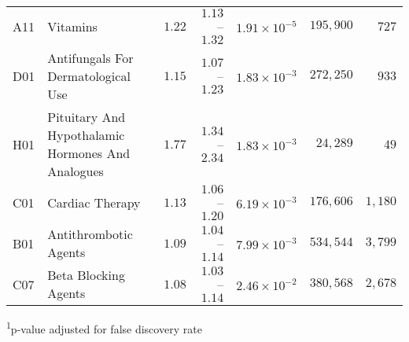 \begin{longtable}{llrrrrr}
A11 & Vitamins & $1.22$ & $1.13$–$1.32$ & $1.91 \times 10^{-5}$ & $195,900$ & $727$ \\ 
D01 & Antifungals For Dermatological Use & $1.15$ & $1.07$–$1.23$ & $1.83 \times 10^{-3}$ & $272,250$ & $933$ \\ 
H01 & Pituitary And Hypothalamic Hormones And Analogues & $1.77$ & $1.34$–$2.34$ & $1.83 \times 10^{-3}$ & $24,289$ & $49$ \\ 
C01 & Cardiac Therapy & $1.13$ & $1.06$–$1.20$ & $6.19 \times 10^{-3}$ & $176,606$ & $1,180$ \\ 
B01 & Antithrombotic Agents & $1.09$ & $1.04$–$1.14$ & $7.99 \times 10^{-3}$ & $534,544$ & $3,799$ \\ 
C07 & Beta Blocking Agents & $1.08$ & $1.03$–$1.14$ & $2.46 \times 10^{-2}$ & $380,568$ & $2,678$ \\ 
\bottomrule
\end{longtable}
\begin{minipage}{\linewidth}
\textsuperscript{1}p-value adjusted for false discovery rate\\
\end{minipage}

